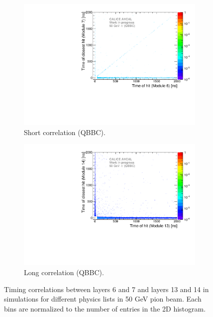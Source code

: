 \begin{figure}[htbp!]
\begin{subfigure}[t]{0.49\textwidth}
    \centering
    \includegraphics[width=1\textwidth]{../Thesis_Plots/Timing/Pions/Plots/ComparisonToSim/Time_Correlation_50GeV_short_QBBC.pdf}
    \caption{Short correlation (QBBC).} \label{fig:Corr_short_QBBC}
  \end{subfigure}
  \hfill
  \begin{subfigure}[t]{0.49\textwidth}
    \centering
    \includegraphics[width=1\textwidth]{../Thesis_Plots/Timing/Pions/Plots/ComparisonToSim/Time_Correlation_50GeV_long_QBBC.pdf}
    \caption{Long correlation (QBBC).} \label{fig:Corr_long_QBBC}
  \end{subfigure}
  \caption{Timing correlations between layers 6 and 7 and layers 13 and 14 in \mokka simulations for different physics lists in 50 GeV pion beam. Each bins are normalized to the number of entries in the 2D histogram.}
\end{figure}

